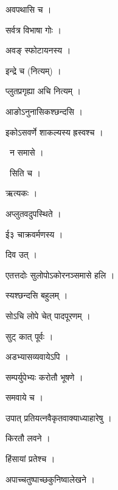 \documentclass[10pt, openany, oneside]{book}
\begin{document}
\noindent अवपथासि च ।

\noindent सर्वत्र विभाषा गोः ।

\noindent अवङ् स्फोटायनस्य ।

\noindent इन्द्रे च (नित्यम्) ।

\noindent प्लुतप्रगृह्या अचि नित्यम् ।

\noindent आङोऽनुनासिकश्छन्दसि ।

\noindent इकोऽसवर्णे शाकल्यस्य ह्रस्वश्च ।

\par\noindent\hspace{1.5em}{\vps वा॰}~{\qt न समासे ।}

\par\noindent\hspace{1.5em}{\vps वा॰}~{\qt सिति च ।}

\noindent ऋत्यकः ।

\noindent अप्लुतवदुपस्थिते ।

\noindent ई३ चाक्रवर्मणस्य ।

\noindent दिव उत् ।

\noindent एतत्तदोः सुलोपोऽकोरनञ्समासे हलि ।

\noindent स्यश्छन्दसि बहुलम् ।

\noindent सोऽचि लोपे चेत् पादपूरणम् ।

\noindent सुट् कात् पूर्वः ।

\noindent अडभ्यासव्यवायेऽपि ।

\noindent सम्पर्युपेभ्यः करोतौ भूषणे ।

\noindent समवाये च ।

\noindent उपात् प्रतियत्नवैकृतवाक्याध्याहारेषु ।

\noindent किरतौ लवने ।

\noindent हिंसायां प्रतेश्च ।

\noindent अपाच्चतुष्पाच्छकुनिष्वालेखने ।
\end{document}
